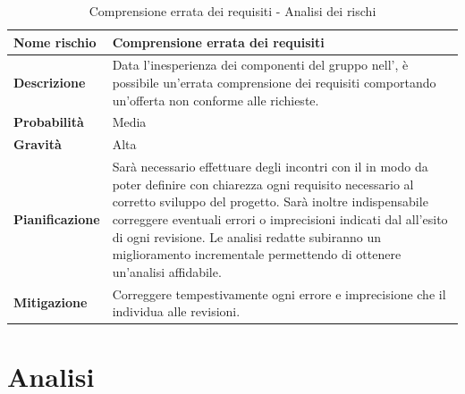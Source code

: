 \documentclass[12pt,a4paper]{article}
\begin{document}
\begin{table}[H]
	\begin{center}
		\begin{tabular}{p{} p{}}
			\toprule
			\textbf{Nome rischio} & \textbf{ Comprensione errata dei requisiti} \\
			\midrule
			\midrule
			\textbf{Descrizione} & Data l’inesperienza dei componenti del gruppo nell’\AdR, è possibile un’errata comprensione dei requisiti comportando un’offerta non conforme alle richieste. \\
			\midrule
			\textbf{Probabilità} & Media \\
			\midrule
			\textbf{Gravità} & Alta \\
			\midrule
			\textbf{Pianificazione} &  Sarà necessario effettuare degli incontri con il \mgls{proponente} in modo da poter definire con chiarezza
			ogni requisito necessario al corretto sviluppo del progetto. Sarà inoltre indispensabile correggere eventuali errori o imprecisioni indicati dal \mgls{committente} all’esito di ogni revisione. Le analisi redatte subiranno un miglioramento incrementale permettendo di ottenere un’analisi affidabile. \\
			\midrule
			\textbf{Mitigazione} & Correggere tempestivamente ogni errore e imprecisione che il \mgls{committente} individua alle revisioni. \\
			\bottomrule
		\end{tabular}
		\caption{Comprensione errata dei requisiti - Analisi dei rischi}
	\end{center}
\end{table}

\newpage

\section{Analisi}
\end{document}
